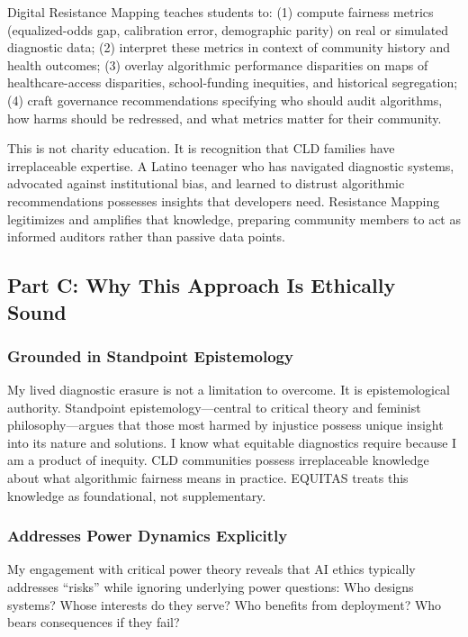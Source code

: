 \documentclass[12pt,a4paper]{article}
\begin{document}
Digital Resistance Mapping teaches students to: (1) compute fairness metrics (equalized-odds gap, calibration error, demographic parity) on real or simulated diagnostic data; (2) interpret these metrics in context of community history and health outcomes; (3) overlay algorithmic performance disparities on maps of healthcare-access disparities, school-funding inequities, and historical segregation; (4) craft governance recommendations specifying who should audit algorithms, how harms should be redressed, and what metrics matter for their community.

This is not charity education. It is recognition that CLD families have irreplaceable expertise. A Latino teenager who has navigated diagnostic systems, advocated against institutional bias, and learned to distrust algorithmic recommendations possesses insights that developers need. Resistance Mapping legitimizes and amplifies that knowledge, preparing community members to act as informed auditors rather than passive data points.

\subsection{Part C: Why This Approach Is Ethically Sound}

\subsubsection{Grounded in Standpoint Epistemology}

My lived diagnostic erasure is not a limitation to overcome. It is epistemological authority. Standpoint epistemology—central to critical theory and feminist philosophy—argues that those most harmed by injustice possess unique insight into its nature and solutions. I know what equitable diagnostics require because I am a product of inequity. CLD communities possess irreplaceable knowledge about what algorithmic fairness means in practice. EQUITAS treats this knowledge as foundational, not supplementary.

\subsubsection{Addresses Power Dynamics Explicitly}

My engagement with critical power theory reveals that AI ethics typically addresses ``risks'' while ignoring underlying power questions: Who designs systems? Whose interests do they serve? Who benefits from deployment? Who bears consequences if they fail?
\end{document}
